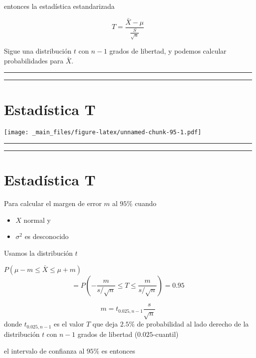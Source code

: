 \documentclass[
]{book}
\providecommand{\tightlist}{%
  \setlength{\itemsep}{0pt}\setlength{\parskip}{0pt}}
\begin{document}
entonces la estadística estandarizada

\[T=\frac{\bar{X}-\mu}{\frac{S}{\sqrt{n}}}\]

Sigue una distribución \(t\) con \(n-1\) grados de libertad, y podemos calcular probabilidades para \(\bar{X}\).

\begin{center}\rule{0.5\linewidth}{0.5pt}\end{center}

\begin{center}\rule{0.5\linewidth}{0.5pt}\end{center}

\hypertarget{estaduxedstica-t-4}{%
\section{Estadística T}\label{estaduxedstica-t-4}}

\texttt{[image: \_main\_files/figure-latex/unnamed-chunk-95-1.pdf]}

\begin{center}\rule{0.5\linewidth}{0.5pt}\end{center}

\begin{center}\rule{0.5\linewidth}{0.5pt}\end{center}

\hypertarget{estaduxedstica-t-5}{%
\section{Estadística T}\label{estaduxedstica-t-5}}

Para calcular el margen de error \(m\) al \(95\%\) cuando

\begin{itemize}
\tightlist
\item
  \(X\) normal y
\item
  \(\sigma^2\) es desconocido
\end{itemize}

Usamos la distribución \(t\)

\(P(\mu-m \leq \bar{X} \leq\mu + m)\)
\[=P(-\frac{m}{s/\sqrt{n}} \leq T \leq\frac{m}{s/\sqrt{n}})=0.95\]

\[m=t_{0.025, n-1} \frac{s}{\sqrt{n}}\]
donde \(t_{0.025, n-1}\) es el valor \(T\) que deja \(2.5\%\) de probabilidad al lado derecho de la distribución \(t\) con \(n-1\) grados de libertad (\(0.025\)-cuantil)

el intervalo de confianza al \(95\%\) es entonces
\end{document}
